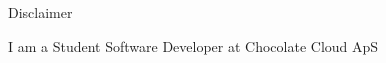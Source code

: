 \begin{frame}{Disclaimer}
  \begin{center}
      I am a Student Software Developer at Chocolate Cloud ApS
  \end{center}
\end{frame}
